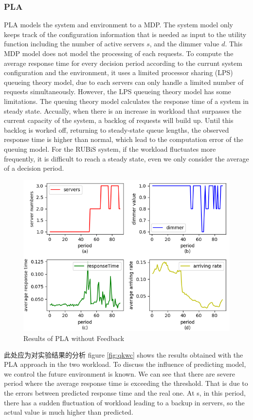 \documentclass[sigconf]{acmart}
\begin{document}
\subsubsection{PLA}
PLA models the system and environment to a MDP. The system model only keeps track of the configuration information that is needed as input to the utility function including the number of active servers $s$, and the dimmer value $d$. This MDP model does not model the processing of each requests. To compute the average response time for every decision period according to the currunt system configuration and the environment, it uses a limited processor sharing (LPS) queueing theory model, due to each servers can only handle a limited number of requests simultaneously. However, the LPS queueing theory model has some limitations. The queuing theory model calculates the response time of a system in steady state. Accually, when there is an increase in workload that surpasses the current capacity of the system, a backlog of requests will build up. Until this backlog is worked off, returning to steady-state queue lengths, the observed response time is higher than normal, which lead to the computation error of the queuing model. For the RUBiS system, if the workload fluctuates more frequently, it is difficult to reach a steady state, even we only consider the average of a decision period.
\begin{figure}[h]
	\centering
	\includegraphics[width=\linewidth]{qkwc}
	\caption{Results of PLA without Feedback}

\end{figure}
此处应为对实验结果的分析
figure \ref{fig:qkwc} shows the results obtained with the PLA approach in the two workload. To discuss the influence of predicting model, we control the future environment is known. We can see that there are severe period where  the average response time is exceeding the threshold. That is due to the errors between predicted response time and the real one. At s, in this period, there has a sudden fluctuation of workload leading to a backup in servers, so the actual value is much higher than predicted.
\end{document}
